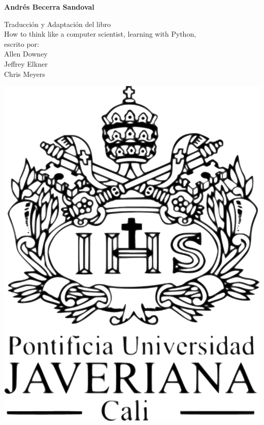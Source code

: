 \thispagestyle{empty} 

\vfill{}
\begin{center}
\textbf{\huge{}\introprog}
\par\end{center}{\huge \par}

\begin{center}
\vfill{}
\par\end{center}

\begin{center}
\textbf{\Large{}Andrés Becerra Sandoval}{\huge{} }
\par\end{center}{\huge \par}

\vfill{}
\begin{flushright}
{\small{}Traducción y Adaptación del libro }\\
{\small{}\flqq{}How to think like a computer scientist, learning
with Python\frqq{}, }\\
{\small{} escrito por: }\\
{\small{} Allen Downey}\\
{\small{} Jeffrey Elkner}\\
{\small{} Chris Meyers}\\
{\small{} } 
\par\end{flushright}

\vfill{}
\begin{center}
\includegraphics[scale=0.2]{illustrations/logo/LogoVerticalNegro} 
\par\end{center}

